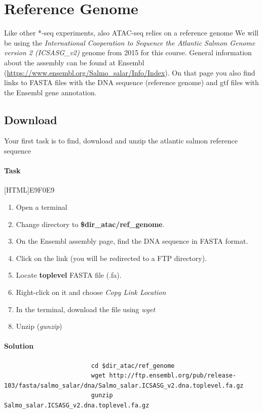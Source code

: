 \documentclass[12pt]{article}
\begin{document}
	\section{Reference Genome}
		Like other *-seq experiments, also ATAC-seq relies on a reference genome
		We will be using the \textit{ International Cooperation to Sequence the Atlantic Salmon Genome  version 2 (ICSASG\_v2)} genome from 2015 for this course. 
		General information about the assembly can be found at Ensembl (\url{https://www.ensembl.org/Salmo_salar/Info/Index}).
		On that page you also find links to FASTA files with the DNA sequence (reference genome) and gtf files with the Ensembl gene annotation.
		
		\subsection{Download}
			Your first task is to find, download and unzip the atlantic salmon reference sequence
			
			\paragraph{Task}
			
				[HTML]{E9F0E9}{\parbox{\linewidth}{%
					\begin{enumerate}
						\item Open a terminal
						\item Change directory to \textbf{\$dir\_atac/ref\_genome}.
						\item On the Ensembl assembly page, find the DNA sequence in FASTA format.
						\item Click on the link (you will be redirected to a FTP directory).
						\item Locate  \textbf{toplevel}  FASTA file (.fa).
						\item Right-click on it and choose \textit{Copy Link Location}
						\item In the terminal, download the file using \textit{wget}
						\item Unzip (\textit{gunzip})
					\end{enumerate}
				}}
			
			\paragraph{Solution}
			
				\begin{minipage}{\linewidth}
					\begin{lstlisting}
						cd $dir_atac/ref_genome  
						wget http://ftp.ensembl.org/pub/release-103/fasta/salmo_salar/dna/Salmo_salar.ICSASG_v2.dna.toplevel.fa.gz
						gunzip Salmo_salar.ICSASG_v2.dna.toplevel.fa.gz
					\end{lstlisting}
				\end{minipage}
		
\end{document}
